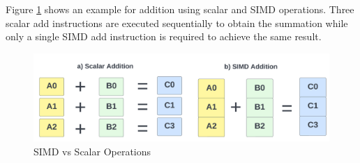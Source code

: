 Figure \ref{fig:simdscalar} shows an example for addition using scalar and SIMD operations. Three scalar add instructions are executed sequentially to obtain the summation while only a single SIMD add instruction is required to achieve the same result.

\begin{figure}[ht]
\includegraphics[width=\textwidth]{imgs/simd-add.png}
\caption[SIMD vs Scalar]{SIMD vs Scalar Operations \cite{simdscalar}}\label{fig:simdscalar}
\end{figure}